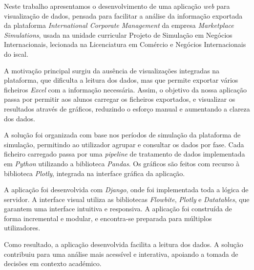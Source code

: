 




Neste trabalho apresentamos o desenvolvimento de uma aplicação \textit{web} para visualização de dados, pensada para facilitar a análise da informação exportada da plataforma \textit{International Corporate Management} da empresa \textit{Marketplace Simulations}, usada na unidade curricular Projeto de Simulação em Negócios Internacionais, lecionada na Licenciatura em Comércio e Negócios Internacionais do \gls{iscal}.

A motivação principal surgiu da ausência de visualizações integradas na plataforma, que dificulta a leitura dos dados, mas que permite exportar vários ficheiros \textit{Excel} com a informação necessária. Assim, o objetivo da nossa aplicação passa por permitir aos alunos carregar os ficheiros exportados, e visualizar os resultados através de gráficos, reduzindo o esforço manual e aumentando a clareza dos dados.

A solução foi organizada com base nos períodos de simulação da plataforma de simulação, permitindo ao utilizador agrupar e consultar os dados por fase. Cada ficheiro carregado passa por uma \textit{pipeline} de tratamento de dados implementada em \textit{Python} utilizando a biblioteca \textit{Pandas}. Os gráficos são feitos com recurso à biblioteca \textit{Plotly}, integrada na interface gráfica da aplicação.

A aplicação foi desenvolvida com \textit{Django}, onde foi implementada toda a lógica de servidor. A interface visual utiliza as bibliotecas \textit{Flowbite}, \textit{Plotly} e \textit{Datatables}, que garantem uma interface intuitiva e responsiva. A aplicação foi construída de forma incremental e modular, e encontra-se preparada para múltiplos utilizadores.

Como resultado, a aplicação desenvolvida facilita a leitura dos dados. A solução contribuiu para uma análise mais acessível e interativa, apoiando a tomada de decisões em contexto académico.

